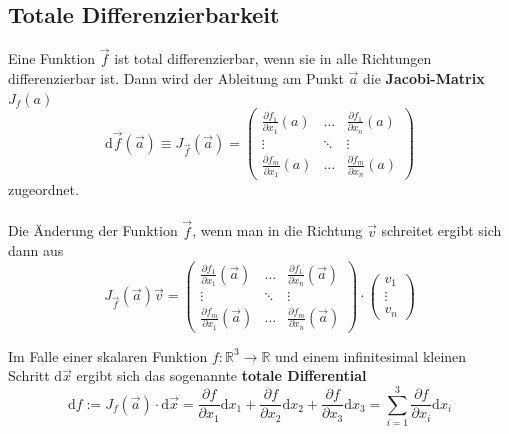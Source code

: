 \documentclass{article}
\newcommand{\diff}{\mathrm{d}}
\begin{document}
\subsection{Totale Differenzierbarkeit}
Eine Funktion $\vec{f}$ ist total differenzierbar, wenn sie in alle Richtungen differenzierbar ist. Dann wird der Ableitung am Punkt $\vec{a}$ die \textbf{Jacobi-Matrix} $J_f(a)$
	\begin{equation}
		\diff\vec{f}(\vec{a}) \equiv J_{\vec{f}}(\vec{a}) =
		\begin{pmatrix}
			\frac{\partial f_1}{\partial x_1}(a) & \dots & \frac{\partial f_1}{\partial x_n}(a) \\
			\vdots & \ddots & \vdots \\
			\frac{\partial f_m}{\partial x_1}(a) & \dots & \frac{\partial f_m}{\partial x_n}(a)
		\end{pmatrix}
	\end{equation}
zugeordnet.\\
\\
Die Änderung der Funktion $\vec{f}$, wenn man in die Richtung $\vec{v}$ schreitet ergibt sich dann aus
	\begin{equation}
		J_{\vec{f}}(\vec{a})\vec{v} =
		\begin{pmatrix}
			\frac{\partial f_1}{\partial x_1}(\vec{a}) & \dots & \frac{\partial f_1}{\partial x_n}(\vec{a}) \\
			\vdots & \ddots & \vdots \\
			\frac{\partial f_m}{\partial x_1}(\vec{a}) & \dots & \frac{\partial f_m}{\partial x_n}(\vec{a})
		\end{pmatrix}
		\cdot
		\begin{pmatrix}
			v_1\\
			\vdots\\
			v_n
		\end{pmatrix}
	\end{equation}

Im Falle einer skalaren Funktion $f:\mathbb{R}^3\to\mathbb{R}$ und einem infinitesimal kleinen Schritt $\diff \vec{x}$ ergibt sich das sogenannte \textbf{totale Differential}
	\begin{equation}
		\diff f := J_f(\vec{a})\cdot\diff\vec{x} = \frac{\partial f}{\partial x_1} \diff x_1 + \frac{\partial f}{\partial x_2} \diff x_2 + \frac{\partial f}{\partial x_3} \diff x_3 = \sum_{i=1}^3 \frac{\partial f}{\partial x_i} \diff x_i
	\end{equation}
\end{document}
